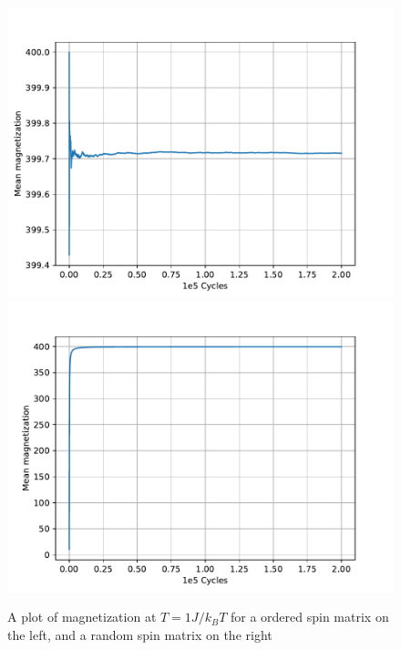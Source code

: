 \documentclass[a4paper]{article}
\begin{document}
\begin{figure}[!htb]
	\centering 
	\includegraphics[scale=0.56]{../opp_c_m_10K_200000_o.pdf}
	\includegraphics[scale=0.56]{../opp_c_m_10K_200000_r.pdf}
	\caption{A plot of magnetization at $T = 1J/k_B T$ for a ordered spin matrix on the left, and a random spin matrix on the right}
	\label{c_m_1}
\end{figure}
\end{document}
